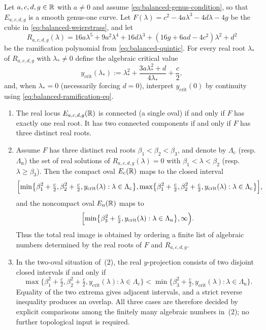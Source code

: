 \begin{theorem}\label{thm:balanced-real-projection}
Let $a,c,d,g\in\mathbb{R}$ with $a\neq0$ and assume \eqref{eq:balanced-genus-condition}, so that $E_{a,c,d,g}$ is a smooth genus-one curve.
Let $F(\lambda)=c^2-4a\lambda^3-4d\lambda-4g$ be the cubic in \eqref{eq:balanced-weierstrass}, and let
\[
R_{a,c,d,g}(\lambda)
=
16a\lambda^5+9a^2\lambda^4+16d\lambda^3+(16g+6ad-4c^2)\lambda^2+d^2
\]
be the ramification polynomial from \eqref{eq:balanced-quintic}.
For every real root $\lambda_*$ of $R_{a,c,d,g}$ with $\lambda_*\ne 0$ define the algebraic critical value
\begin{equation}\label{eq:ycrit-definition}
y_{\mathrm{crit}}(\lambda_*):=\lambda_*^2+\frac{3a\lambda_*^2+d}{4\lambda_*}+\frac{c}{2},
\end{equation}
and, when $\lambda_*=0$ (necessarily forcing $d=0$), interpret $y_{\mathrm{crit}}(0)$ by continuity using \eqref{eq:balanced-ramification-eq}.

\begin{enumerate}
\item The real locus $E_{a,c,d,g}(\mathbb{R})$ is connected (a single oval) if and only if $F$ has exactly one real root.
It has two connected components if and only if $F$ has three distinct real roots.

\item Assume $F$ has three distinct real roots $\beta_1<\beta_2<\beta_3$, and denote by $\Lambda_{\mathrm{c}}$ (resp.~$\Lambda_{\mathrm{n}}$) the set of real solutions of $R_{a,c,d,g}(\lambda)=0$ with $\beta_1<\lambda<\beta_2$ (resp.~$\lambda\ge \beta_3$).
Then the compact oval $E_{\mathrm{c}}(\mathbb{R})$ maps to the closed interval
\[
\Bigl[\min\bigl\{\beta_1^2+\tfrac{c}{2},\beta_2^2+\tfrac{c}{2},y_{\mathrm{crit}}(\lambda):\lambda\in\Lambda_{\mathrm{c}}\bigr\},
\max\bigl\{\beta_1^2+\tfrac{c}{2},\beta_2^2+\tfrac{c}{2},y_{\mathrm{crit}}(\lambda):\lambda\in\Lambda_{\mathrm{c}}\bigr\}\Bigr],
\]
and the noncompact oval $E_{\mathrm{n}}(\mathbb{R})$ maps to
\[
\Bigl[\min\bigl\{\beta_3^2+\tfrac{c}{2},y_{\mathrm{crit}}(\lambda):\lambda\in\Lambda_{\mathrm{n}}\bigr\},\infty\Bigr).
\]
Thus the total real image is obtained by ordering a finite list of algebraic numbers determined by the real roots of $F$ and $R_{a,c,d,g}$.

\item In the two-oval situation of~(2), the real $y$-projection consists of two disjoint closed intervals if and only if
\[
\max\bigl\{\beta_1^2+\tfrac{c}{2},\beta_2^2+\tfrac{c}{2},y_{\mathrm{crit}}(\lambda):\lambda\in\Lambda_{\mathrm{c}}\bigr\}
<
\min\bigl\{\beta_3^2+\tfrac{c}{2},y_{\mathrm{crit}}(\lambda):\lambda\in\Lambda_{\mathrm{n}}\bigr\}.
\]
Equality of the two extrema gives adjacent intervals, and a strict reverse inequality produces an overlap.
All three cases are therefore decided by explicit comparisons among the finitely many algebraic numbers in~(2); no further topological input is required.
\end{enumerate}
\end{theorem}

